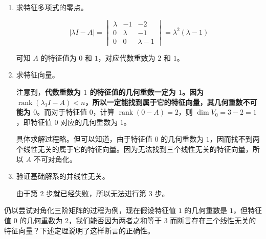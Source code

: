\begin{solve}
	\begin{enumerate}
		\item 求特征多项式的零点。

		$$
		|\lambda I - A| = \begin{vmatrix} \lambda & -1 & -2 \\ 0 & \lambda & -1 \\ 0 & 0 & \lambda - 1 \end{vmatrix} = \lambda^2(\lambda - 1)
		$$

		可知 $A$ 的特征值为 $0$ 和 $1$，对应代数重数为 $2$ 和 $1$。

		\item 求特征向量。

		注意到，\textbf{代数重数为 $1$ 的特征值的几何重数一定为 $1$。因为 $\operatorname{rank} (\lambda_1 I - A) < n$，所以一定能找到属于它的特征向量，其几何重数不可能为 $0$}。而对于特征值 $0$，计算 $\operatorname{rank}(0 - A) = 2$，则 $\dim V_0 = 3 - 2 = 1$，即特征值 $0$ 对应的几何重数为 $1$。

		具体求解过程略。但可以知道，由于特征值 $0$ 的几何重数为 $1$，因而找不到两个线性无关的属于它的特征向量。因为无法找到三个线性无关的特征向量，所以 $A$ 不可对角化。

		\item 验证基础解系的并线性无关。

		由于第 2 步就已经失败，所以无法进行第 3 步。
	\end{enumerate}
\end{solve}

仍以尝试对角化三阶矩阵的过程为例，现在假设特征值 $1$ 的几何重数是 $1$，但特征值 $0$ 的几何重数为 $2$，我们能否因为两者之和等于 $3$ 而断言存在三个线性无关的特征向量？下述定理说明了这样断言的正确性。

